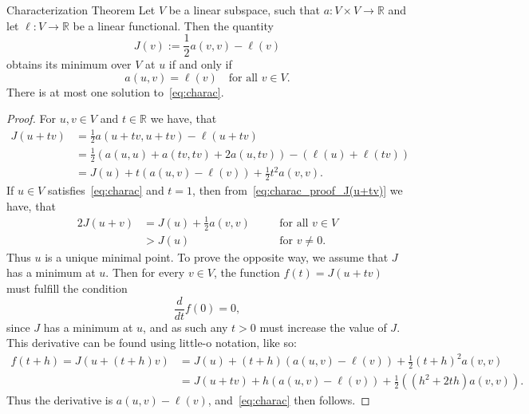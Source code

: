 
\begin{thmx}{Characterization Theorem}
    Let $V$ be a linear subspace, such that
        \(
            a: V \times V \rightarrow \mathbb{R}
        \) and
     let
        \(
            \ell: V \rightarrow \mathbb{R}
        \)
    be a linear functional. Then the quantity
        \[
            J(v):=\frac{1}{2} a(v,v) - \ell(v)
        \]
    obtains its minimum over $V$ at $u$ if and only if
        \begin{equation}
            a(u,v) = \ell(v) \quad \text{for all } v \in V.
        \label{eq:charac}
        \end{equation}
    There is at most one solution to~\eqref{eq:charac}.\label{thm:charac_theorem}
\end{thmx}

\begin{proof}
    For $u,v \in V$ and $t \in \mathbb{R}$ we have, that
    \begin{align}
        J(u+tv) &= \frac{1}{2} a(u+tv,u+tv) - \ell(u+tv) \nonumber \\
        &= \frac{1}{2} \left( a(u,u) + a(tv,tv) + 2a(u,tv) \right) - \left(  \ell(u) + \ell(tv)\right) \nonumber \\
        &= J(u) + t\left( a(u,v) - \ell(v) \right) + \frac{1}{2}t^2a(v,v). \label{eq:charac_proof_J(u+tv)}
    \end{align}
    If $u \in V$ satisfies~\eqref{eq:charac} and $t=1$, then from~\eqref{eq:charac_proof_J(u+tv)} we have, that
    \begin{alignat}{2}
        J(u+v) &= J(u) + \frac{1}{2}a(v,v) \quad &&\text{for all } v\in V  \nonumber \\
        &> J(u) \quad &&\text{for } v \neq 0.
    \end{alignat}
    Thus $u$ is a unique minimal point. 
    To prove the opposite way, we assume that $J$ has a minimum at $u$.
    Then for every $v\in V$, the function $f(t)= J(u+tv)$ must fulfill the condition
    \begin{equation*}
        \frac{d}{dt}f(0) = 0,
    \end{equation*}
    since $J$ has a minimum at $u$, and as such any $t>0$ must increase the 
    value of $J$.
    This derivative can be found using little-o notation, like so:
    \begin{align*}
          f(t+h) = J(u+(t+h)v) &= J(u) + (t+h) (a(u,v) - \ell(v)) + \frac{1}{2}{(t+h)}^2 a(v,v) \\
          &= J(u+tv) + h(a(u,v) - \ell(v)) + \frac{1}{2}((h^2+2th)a(v,v)).
    \end{align*}
    Thus the derivative is $a(u,v) - \ell(v)$, and~\eqref{eq:charac} then follows.
\end{proof}